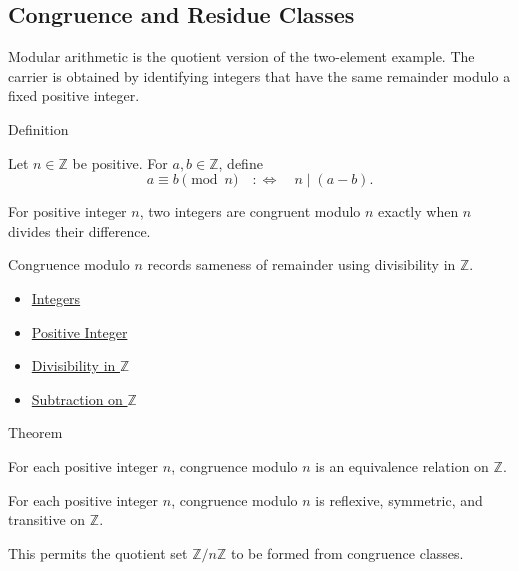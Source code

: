 \subsection*{Congruence and Residue Classes}

\begin{remark*}[Exposition]
Modular arithmetic is the quotient version of the two-element example. The
carrier is obtained by identifying integers that have the same remainder
modulo a fixed positive integer.
\end{remark*}

\begin{definitionbox}{Definition}
\begin{definition}
\label{def:congruence-modulo-integer}
Let \(n\in\mathbb{Z}\) be positive. For \(a,b\in\mathbb{Z}\), define
\[
a\equiv b \pmod n
\quad:\Longleftrightarrow\quad
n\mid (a-b).
\]
\end{definition}

\begin{remark*}
For positive integer \(n\), two integers are congruent modulo \(n\) exactly
when \(n\) divides their difference.
\end{remark*}

\begin{remark*}[Interpretation]
Congruence modulo \(n\) records sameness of remainder using divisibility in
\(\mathbb{Z}\).
\end{remark*}
\end{definitionbox}

\begin{dependencies}
\begin{itemize}
  \item \hyperref[def:integers]{Integers}
  \item \hyperref[def:positive-integer]{Positive Integer}
  \item \hyperref[def:divisibility-in-z]{Divisibility in \(\mathbb{Z}\)}
  \item \hyperref[def:subtraction-on-z]{Subtraction on \(\mathbb{Z}\)}
\end{itemize}
\end{dependencies}

\begin{theorembox}{Theorem}
\begin{theorem}
\label{thm:congruence-modulo-integer-equivalence}
For each positive integer \(n\), congruence modulo \(n\) is an equivalence
relation on \(\mathbb{Z}\).
\end{theorem}

\begin{remark*}
For each positive integer \(n\), congruence modulo \(n\) is reflexive,
symmetric, and transitive on \(\mathbb{Z}\).
\end{remark*}

\begin{remark*}[Interpretation]
This permits the quotient set \(\mathbb{Z}/n\mathbb{Z}\) to be formed from
congruence classes.
\end{remark*}
\end{theorembox}

